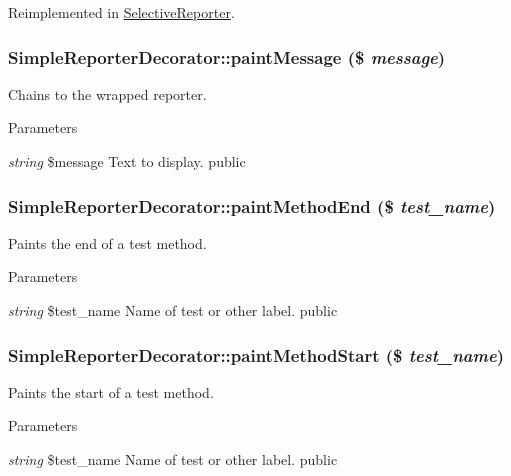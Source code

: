 Reimplemented in \hyperlink{class_selective_reporter_af83e76607ce4fed137722eadc77549ff}{SelectiveReporter}.\hypertarget{class_simple_reporter_decorator_a42f3412ccd3f983be7b5a6bdb7cff7c1}{
\subsubsection[{paintMessage}]{\setlength{\rightskip}{0pt plus 5cm}SimpleReporterDecorator::paintMessage (\$ {\em message})}}
\label{class_simple_reporter_decorator_a42f3412ccd3f983be7b5a6bdb7cff7c1}
Chains to the wrapped reporter. 
\begin{DoxyParams}{Parameters}
\item[{\em string}]\$message Text to display.  public \end{DoxyParams}
\hypertarget{class_simple_reporter_decorator_ae8bc09f969225a04c13cf735e72ab2cb}{
\subsubsection[{paintMethodEnd}]{\setlength{\rightskip}{0pt plus 5cm}SimpleReporterDecorator::paintMethodEnd (\$ {\em test\_\-name})}}
\label{class_simple_reporter_decorator_ae8bc09f969225a04c13cf735e72ab2cb}
Paints the end of a test method. 
\begin{DoxyParams}{Parameters}
\item[{\em string}]\$test\_\-name Name of test or other label.  public \end{DoxyParams}
\hypertarget{class_simple_reporter_decorator_a3877f093e787635206b8e73d626cae81}{
\subsubsection[{paintMethodStart}]{\setlength{\rightskip}{0pt plus 5cm}SimpleReporterDecorator::paintMethodStart (\$ {\em test\_\-name})}}
\label{class_simple_reporter_decorator_a3877f093e787635206b8e73d626cae81}
Paints the start of a test method. 
\begin{DoxyParams}{Parameters}
\item[{\em string}]\$test\_\-name Name of test or other label.  public \end{DoxyParams}
